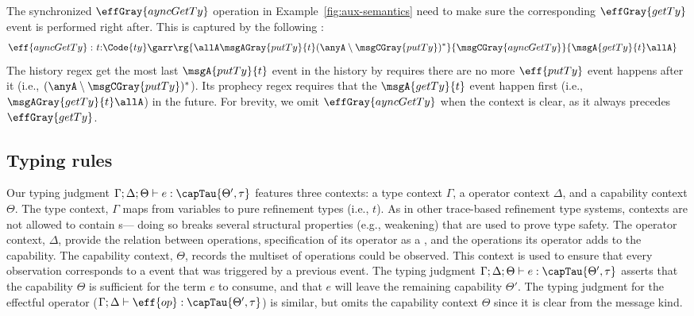 \begin{example}\label{ex:getty}
The synchronized $\effGray{ayncGetTy}$ operation in Example~\ref{fig:aux-semantics} need to make sure the corresponding $\effGray{getTy}$ event is performed right after. This is captured by the following \PAT{}:{
    \footnotesize
    \begin{align*}
      \eff{ayncGetTy} :~ & t{:}\Code{ty}\garr\rg{\allA\msgAGray{putTy}{t}(\anyA\setminus\msgCGray{putTy})^*}{\msgCGray{ayncGetTy}}{\msgA{getTy}{t}\allA}
    \end{align*}}\noindent
  The history regex get the most last $\msgA{putTy}{t}$ event in the history by requires there are no more $\eff{putTy}$ event happens after it (i.e., $(\anyA\setminus\msgCGray{putTy})^*$). Its prophecy regex requires that the $\msgA{getTy}{t}$ event happen first (i.e., $\msgAGray{getTy}{t}\allA$) in the future.
  For brevity, we omit $\effGray{ayncGetTy}$ when the context is clear, as it always precedes $\effGray{getTy}$.
\end{example}

\subsection{Typing rules}
Our typing judgment $\Gamma; \Delta; \Theta \vdash e: \capTau{\Theta', \tau}$ features three contexts: a type context $\Gamma$,
a operator context $\Delta$, and a capability context $\Theta$. The
type context, $\Gamma$ maps from variables to pure refinement types
(i.e., $t$). As in other trace-based refinement type systems, contexts
are not allowed to contain \PAT{}s--- doing so breaks several
structural properties (e.g., weakening) that are used to prove type
safety. The operator context, $\Delta$, provide the relation between operations, specification of its operator as a \PAT{}, and the operations
its operator adds to the capability. The capability context, $\Theta$,
records the multiset of operations could be observed. This context
is used to ensure that every observation corresponds to a event that
was triggered by a previous event.
The typing judgment $\Gamma; \Delta; \Theta \vdash e: \capTau{\Theta', \tau}$ asserts that the capability $\Theta$ is sufficient for the term $e$ to consume, and that $e$ will leave the remaining capability $\Theta'$.
The typing judgment for the effectful operator ($\Gamma; \Delta \vdash \eff{op}: \capTau{\Theta', \tau}$) is similar, but omits the capability context $\Theta$ since it is clear from the message kind.

